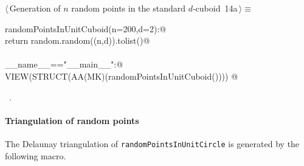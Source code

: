 \documentclass[11pt,oneside]{article}	%
\begin{document}
\begin{flushleft} \small \label{scrap24}
\protect{}$\langle\,$Generation of $n$ random points in the standard $d$-cuboid\nobreak\ {\footnotesize 14a}$\,\rangle\equiv$
\vspace{-1ex}
\begin{list}{}{} \item
\mbox{}\verb@def randomPointsInUnitCuboid(n=200,d=2):@\\
\mbox{}\verb@   return random.random((n,d)).tolist()@\\
\mbox{}\verb@@\\
\mbox{}\verb@if __name__=="__main__":@\\
\mbox{}\verb@   VIEW(STRUCT(AA(MK)(randomPointsInUnitCuboid()))) @\\
\mbox{}\verb@@{\NWsep}
\end{list}
\vspace{-1ex}
\footnotesize\addtolength{\baselineskip}{-1ex}
\begin{list}{}{\setlength{\itemsep}{-\parsep}\setlength{\itemindent}{-\leftmargin}}
\item \NWtxtMacroRefIn\ .
\end{list}
\end{flushleft}



\paragraph{Triangulation of random points} The Delaunay triangulation of \texttt{randomPointsInUnitCircle} is generated by the following macro.
\end{document}
